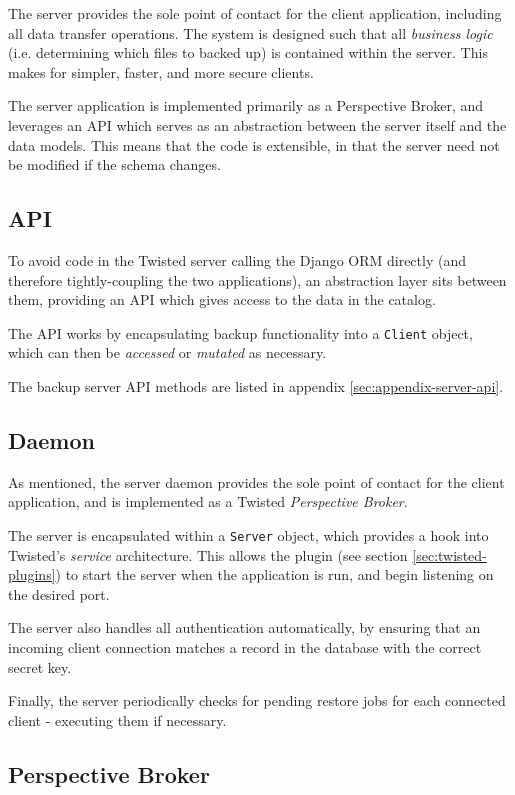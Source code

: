 The server provides the sole point of contact for the client application,
including all data transfer operations. The system is designed such that all
\emph{business logic} (i.e. determining which files to backed up) is contained
within the server. This makes for simpler, faster, and more secure clients.

The server application is implemented primarily as a Perspective Broker, and
leverages an API which serves as an abstraction between the server itself and
the data models. This means that the code is extensible, in that the server
need not be modified if the schema changes.

\subsection{API}

To avoid code in the Twisted server calling the Django ORM directly (and
therefore tightly-coupling the two applications), an abstraction layer sits
between them, providing an API which gives access to the data in the catalog.

The API works by encapsulating backup functionality into a \verb!Client!
object, which can then be \emph{accessed} or \emph{mutated} as necessary.

The backup server API methods are listed in appendix
\ref{sec:appendix-server-api}.

\subsection{Daemon}

As mentioned, the server daemon provides the sole point of contact for the
client application, and is implemented as a Twisted \emph{Perspective Broker}.

The server is encapsulated within a \verb!Server! object, which provides a hook
into Twisted's \emph{service} architecture. This allows the plugin (see section
\ref{sec:twisted-plugins}) to start the server when the application is run, and
begin listening on the desired port.

The server also handles all authentication automatically, by ensuring that
an incoming client connection matches a record in the database with the correct
secret key.

Finally, the server periodically checks for pending restore jobs for each
connected client - executing them if necessary.

\subsection{Perspective Broker}


